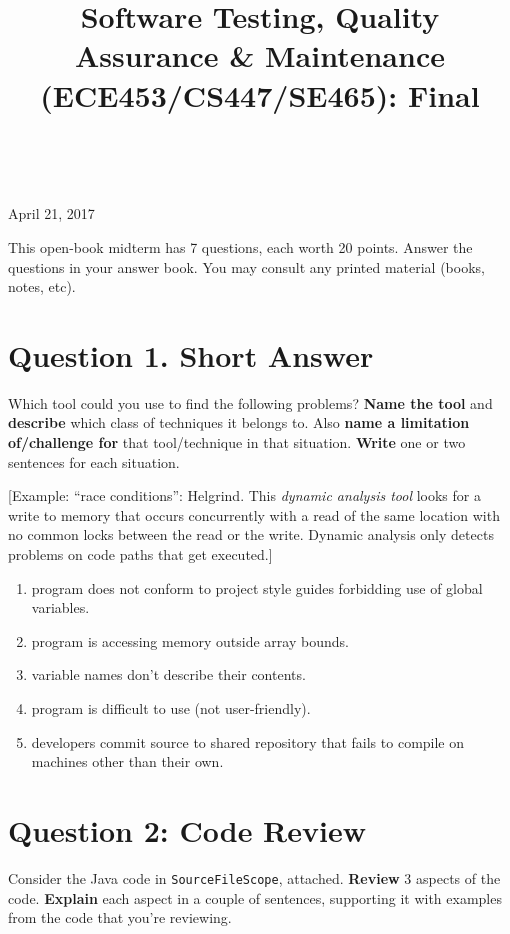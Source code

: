 \documentclass[12pt]{article}
\begin{document}
\title{Software Testing, Quality Assurance \& Maintenance (ECE453/CS447/SE465): Final}
\author{}
\renewcommand{\today}{}
\maketitle

 ~\\[-7em]

\begin{center}
{\Large April 21, 2017}
\end{center}

This open-book midterm has 7 questions, each worth 20 points. Answer the
questions in your answer book. You may consult any printed material
(books, notes, etc).


\section*{Question 1. Short Answer}
Which tool could you use to find the following problems? {\bf Name the tool} and {\bf describe} which class of techniques it belongs to. Also {\bf name a limitation of/challenge for} that tool/technique in that situation.
{\bf Write} one or two sentences for each situation.

[Example: ``race conditions'': Helgrind. This \emph{dynamic analysis
    tool} looks for a write to memory that occurs concurrently with a
  read of the same location with no common locks between the read or
  the write. Dynamic analysis only detects problems on code paths that
  get executed.]

\begin{enumerate}[label=\alph*.]
\item program does not conform to project style guides forbidding use of global variables.
\item program is accessing memory outside array bounds.
\item variable names don't describe their contents.
\item program is difficult to use (not user-friendly).
\item developers commit source to shared repository that fails to compile on machines other than their own.
\end{enumerate}

\section*{Question 2: Code Review}
Consider the Java code in {\tt SourceFileScope}, attached. {\bf Review} 3 aspects of the code. {\bf Explain} each aspect in a couple of
sentences, supporting it with examples from the code that you're
reviewing. 
\end{document}
